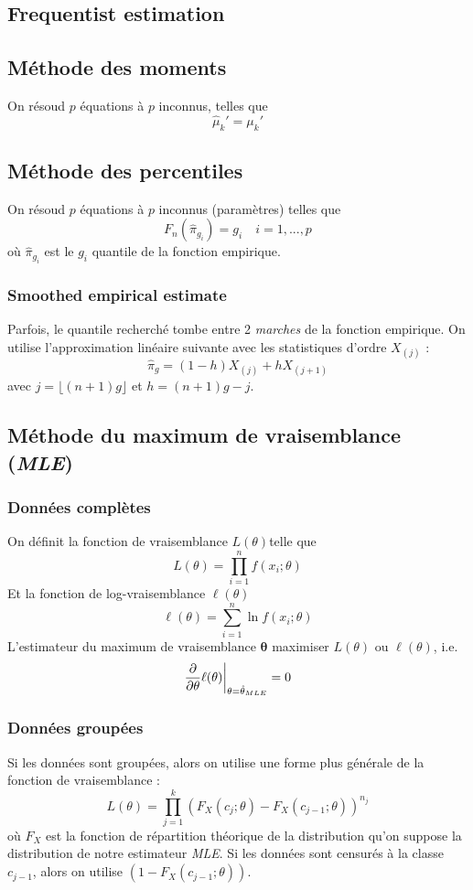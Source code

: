 \documentclass[french, landscape]{article}
\begin{document}
\begin{multicols*}{3}
\section{Frequentist estimation}
\subsection*{Méthode des moments}
On résoud $p$ équations à $p$ inconnus, telles que
\[\hat{\mu}_k' = \mu_k'\]

\subsection*{Méthode des percentiles}
On résoud $p$ équations à $p$ inconnus (paramètres) telles que
\[F_n(\hat{\pi}_{g_i}) = g_i \quad  i = 1, ..., p\]
où $\hat{\pi}_{g_i}$ est le $g_i$ quantile de la fonction empirique.

\subsubsection*{Smoothed empirical estimate}
Parfois, le quantile recherché tombe entre 2 \emph{marches} de la fonction empirique. On utilise l'approximation linéaire suivante avec les statistiques d'ordre $X_{(j)}$ : 
\[\hat{\pi}_{g}  = (1-h)X_{(j)} + h X_{(j+1)} \]
avec $j = \lfloor (n+1)g \rfloor$ et $h = (n+1) g - j$.

\subsection*{Méthode du maximum de vraisemblance (\emph{MLE})}
\subsubsection*{Données complètes}
On définit la fonction de vraisemblance  $L(\theta)$telle que
\[L(\theta) = \prod_{i=1}^{n} f(x_i ; \theta)\]
Et la fonction de log-vraisemblance $\ell(\theta)$
\[\ell(\theta) = \sum_{i=1}^{n}  \ln f(x_i ; \theta) \]
L'estimateur du maximum de vraisemblance $\bm{\theta}$ maximiser $L(\theta)$ ou $\ell(\theta)$, i.e.
\[\frac{\partial}{\partial \theta} \ell(\theta) \biggr \rvert_{\theta = \hat{\theta}_{MLE}}  = 0\]

\subsubsection*{Données groupées}
Si les données sont groupées, alors on utilise une forme plus générale de la fonction de vraisemblance : 
\[L(\theta) =  \prod_{j=1}^{k}  \left( F_X(c_{j} ; \theta) - F_X(c_{j-1} ; \theta) \right)^{n_j}   \]
où $F_X$ est la fonction de répartition théorique de la distribution qu'on suppose la distribution de notre estimateur \emph{MLE}. Si les données sont censurés à la classe $c_{j-1}$, alors on utilise $(1-F_X(c_{j-1}; \theta))$.


\end{multicols*}
\end{document}
